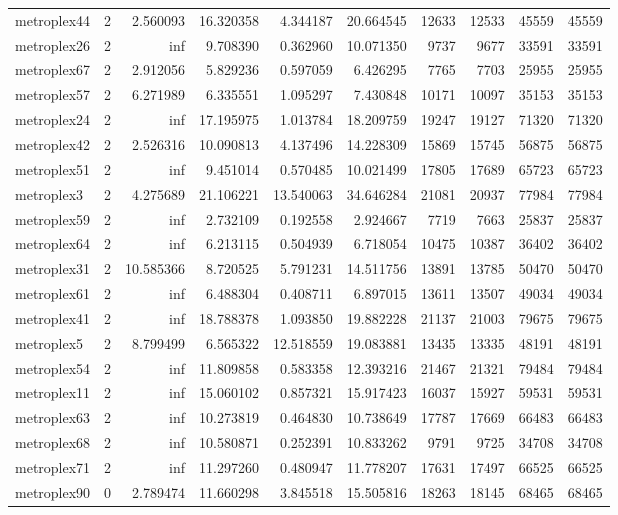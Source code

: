 \begin{longtable}{|l|r|r|r|r|r|r|r|r|r|}
metroplex44 & 2 & 2.560093 & 16.320358 & 4.344187 & 20.664545 & 12633 & 12533 & 45559 & 45559 \\
metroplex26 & 2 & inf & 9.708390 & 0.362960 & 10.071350 & 9737 & 9677 & 33591 & 33591 \\
metroplex67 & 2 & 2.912056 & 5.829236 & 0.597059 & 6.426295 & 7765 & 7703 & 25955 & 25955 \\
metroplex57 & 2 & 6.271989 & 6.335551 & 1.095297 & 7.430848 & 10171 & 10097 & 35153 & 35153 \\
metroplex24 & 2 & inf & 17.195975 & 1.013784 & 18.209759 & 19247 & 19127 & 71320 & 71320 \\
metroplex42 & 2 & 2.526316 & 10.090813 & 4.137496 & 14.228309 & 15869 & 15745 & 56875 & 56875 \\
metroplex51 & 2 & inf & 9.451014 & 0.570485 & 10.021499 & 17805 & 17689 & 65723 & 65723 \\
metroplex3 & 2 & 4.275689 & 21.106221 & 13.540063 & 34.646284 & 21081 & 20937 & 77984 & 77984 \\
metroplex59 & 2 & inf & 2.732109 & 0.192558 & 2.924667 & 7719 & 7663 & 25837 & 25837 \\
metroplex64 & 2 & inf & 6.213115 & 0.504939 & 6.718054 & 10475 & 10387 & 36402 & 36402 \\
metroplex31 & 2 & 10.585366 & 8.720525 & 5.791231 & 14.511756 & 13891 & 13785 & 50470 & 50470 \\
metroplex61 & 2 & inf & 6.488304 & 0.408711 & 6.897015 & 13611 & 13507 & 49034 & 49034 \\
metroplex41 & 2 & inf & 18.788378 & 1.093850 & 19.882228 & 21137 & 21003 & 79675 & 79675 \\
metroplex5 & 2 & 8.799499 & 6.565322 & 12.518559 & 19.083881 & 13435 & 13335 & 48191 & 48191 \\
metroplex54 & 2 & inf & 11.809858 & 0.583358 & 12.393216 & 21467 & 21321 & 79484 & 79484 \\
metroplex11 & 2 & inf & 15.060102 & 0.857321 & 15.917423 & 16037 & 15927 & 59531 & 59531 \\
metroplex63 & 2 & inf & 10.273819 & 0.464830 & 10.738649 & 17787 & 17669 & 66483 & 66483 \\
metroplex68 & 2 & inf & 10.580871 & 0.252391 & 10.833262 & 9791 & 9725 & 34708 & 34708 \\
metroplex71 & 2 & inf & 11.297260 & 0.480947 & 11.778207 & 17631 & 17497 & 66525 & 66525 \\
metroplex90 & 0 & 2.789474 & 11.660298 & 3.845518 & 15.505816 & 18263 & 18145 & 68465 & 68465 \\

\end{longtable}
